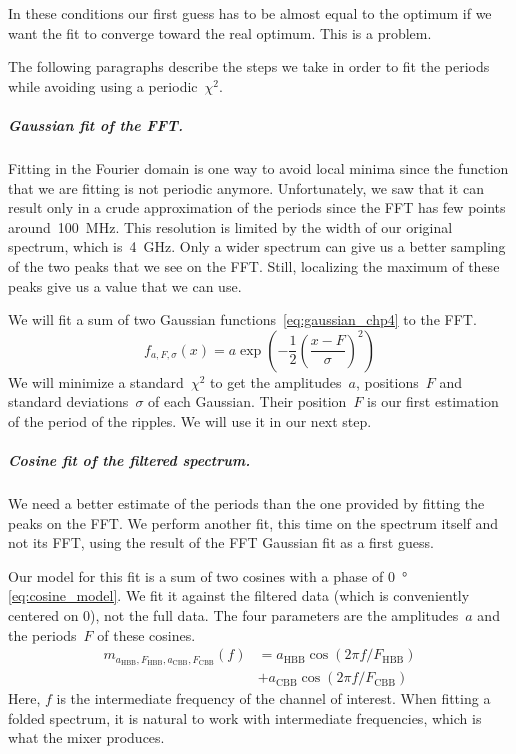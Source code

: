 In these conditions our first guess has to be almost equal to the optimum if we want the fit to converge toward the real optimum.
This is a problem.

The following paragraphs describe the steps we take in order to fit the periods while avoiding using a periodic~$\chi^2$.

\subparagraph{Gaussian fit of the FFT.}
Fitting in the Fourier domain is one way to avoid local minima since the function that we are fitting is not periodic anymore.
Unfortunately, we saw that it can result only in a crude approximation of the periods since the FFT has few points around~\SI{100}{\mega\hertz}.
This resolution is limited by the width of our original spectrum, which is~\SI{4}{\giga\hertz}.
Only a wider spectrum can give us a better sampling of the two peaks that we see on the FFT.
Still, localizing the maximum of these peaks give us a value that we can use.

We will fit a sum of two Gaussian functions~\eqref{eq:gaussian_chp4} to the FFT.
\begin{equation}
    f_{a,F,\sigma}(x)
    =
    a \exp
    \left(
        -
        \frac{1}{2}
        \left(
            \frac{x - F}{\sigma}
        \right)^2
    \right)
    \label{eq:gaussian_chp4}
\end{equation}
We will minimize a standard~$\chi^2$ to get the amplitudes~$a$, positions~$F$ and standard deviations~$\sigma$ of each Gaussian.
Their position~$F$ is our first estimation of the period of the ripples.
We will use it in our next step.

\subparagraph{Cosine fit of the filtered spectrum.}
We need a better estimate of the periods than the one provided by fitting the peaks on the FFT.
We perform another fit, this time on the spectrum itself and not its FFT, using the result of the FFT Gaussian fit as a first guess.

Our model for this fit is a sum of two cosines with a phase of \SI{0}{\degree} \cref{eq:cosine_model}.
We fit it against the filtered data (which is conveniently centered on 0), not the full data.
The four parameters are the amplitudes~$a$ and the periods~$F$ of these cosines.
\begin{equation}
    \begin{aligned}
    m_{a_\text{HBB}, F_\text{HBB}, a_\text{CBB}, F_\text{CBB}}(f)
    &=
    a_\text{HBB} \cos \left(2\pi f/F_\text{HBB} \right)
    \\
    &+
    a_\text{CBB} \cos \left(2\pi f/F_\text{CBB} \right)
    \end{aligned}
    \label{eq:cosine_model}
\end{equation}
Here, $f$ is the intermediate frequency of the channel of interest.
When fitting a folded spectrum, it is natural to work with intermediate frequencies, which is what the mixer produces.

